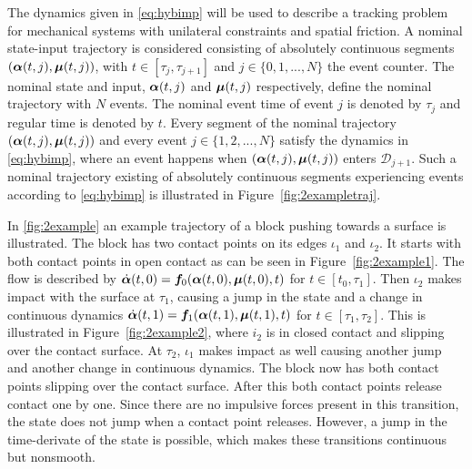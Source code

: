 \documentclass[../DC2017114Bouma.tex]{subfiles}
\begin{document}
The dynamics given in \eqref{eq:hybimp} will be used to describe a tracking problem for mechanical systems with unilateral constraints and spatial friction. A nominal state-input trajectory is considered consisting of absolutely continuous segments $(\boldsymbol{\alpha}(t,j),\boldsymbol{\mu}(t,j))$, with $t\in\left[\tau_j,\tau_{j+1}\right]$ and $j\in\{0,1,...,N\}$ the event counter. The nominal state and input, $\boldsymbol{\alpha}(t,j)$ and $\boldsymbol{\mu}(t,j)$ respectively, define the nominal trajectory with $N$ events. The nominal event time of event $j$ is denoted by $\tau_j$ and regular time is denoted by $t$. Every segment of the nominal trajectory $(\boldsymbol{\alpha}(t,j),\boldsymbol{\mu}(t,j))$ and every event $j\in\{1,2,...,N\}$ satisfy the dynamics in \eqref{eq:hybimp}, where an event happens when $(\boldsymbol{\alpha}(t,j),\boldsymbol{\mu}(t,j))$ enters $\mathcal{D}_{j+1}$. Such a nominal trajectory existing of absolutely continuous segments experiencing events according to \eqref{eq:hybimp} is illustrated in Figure~\ref{fig:2exampletraj}.

In \ref{fig:2example} an example trajectory of a block pushing towards a surface is illustrated. The block has two contact points on its edges $\iota_1$ and $\iota_2$. It starts with both contact points in open contact as can be seen in Figure~\ref{fig:2example1}. The flow is described by $\dot{\boldsymbol{\alpha}}(t,0) = {\boldsymbol{f}}_0(\boldsymbol{\alpha}(t,0),\boldsymbol{\mu}(t,0),t)$ for $t\in[t_0,\tau_1]$. Then $\iota_2$ makes impact with the surface at $\tau_1$, causing a jump in the state and a change in continuous dynamics $\dot{\boldsymbol{\alpha}}(t,1) = {\boldsymbol{f}}_1(\boldsymbol{\alpha}(t,1),\boldsymbol{\mu}(t,1),t)$ for $t\in[\tau_1,\tau_2]$. This is illustrated in Figure~\ref{fig:2example2}, where $i_2$ is in closed contact and slipping over the contact surface. At $\tau_2$, $\iota_1$ makes impact as well causing another jump and another change in continuous dynamics. The block now has both contact points slipping over the contact surface. After this both contact points release contact one by one. Since there are no impulsive forces present in this transition, the state does not jump when a contact point releases. However, a jump in the time-derivate of the state is possible, which makes these transitions continuous but nonsmooth.
\end{document}
